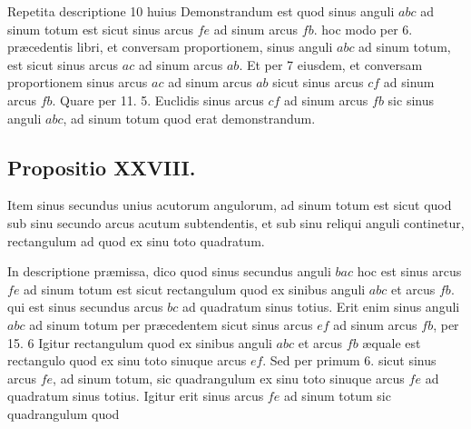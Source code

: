 \documentclass[11pt,a4paper]{article}
\begin{document}
Repetita descriptione 10 huius Demonstrandum est quod sinus
anguli $abc$ ad sinum totum est sicut sinus arcus $fe$ ad sinum
arcus $fb$. hoc modo per 6. præcedentis libri, et conversam
proportionem, sinus anguli $abc$ ad sinum totum, est sicut sinus
arcus $ac$ ad sinum arcus $ab$. Et per 7 eiusdem, et conversam
proportionem sinus arcus $ac$ ad sinum arcus $ab$ sicut sinus
arcus $cf$ ad sinum arcus $fb$. Quare per 11. 5. Euclidis sinus
arcus $cf$ ad sinum arcus $fb$ sic sinus anguli $abc$, ad sinum
totum quod erat demonstrandum.

\subsection*{Propositio XXVIII.}

Item sinus secundus unius acutorum angulorum, ad
sinum totum est sicut quod sub sinu secundo arcus acutum
subtendentis, et sub sinu reliqui anguli continetur,
rectangulum ad quod ex sinu toto quadratum.

In descriptione præmissa, dico quod sinus secundus anguli $bac$
hoc est sinus arcus $fe$ ad sinum totum est sicut rectangulum
quod ex sinibus anguli $abc$ et arcus $fb$. qui est sinus secundus
arcus $bc$ ad quadratum sinus totius. Erit enim sinus anguli
$abc$ ad sinum totum per præcedentem sicut sinus arcus $ef$
ad sinum arcus $fb$, per 15. 6 Igitur rectangulum quod ex sinibus
anguli $abc$ et arcus $fb$ æquale est rectangulo quod ex sinu
toto sinuque arcus $ef$. Sed per primum 6. sicut sinus
arcus $fe$, ad sinum totum, sic quadrangulum ex sinu
toto sinuque arcus $fe$ ad quadratum sinus totius. Igitur
erit sinus arcus $fe$ ad sinum totum sic quadrangulum quod
\end{document}
